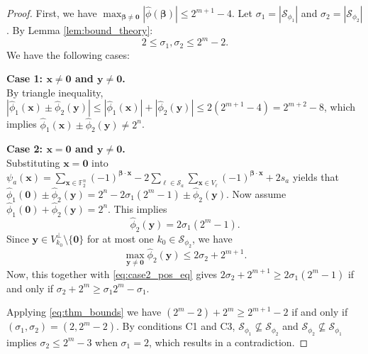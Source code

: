 \documentclass[pdflatex,sn-mathphys-num]{sn-jnl}%
\theoremstyle{thmstyleone}%
\theoremstyle{thmstyletwo}%
\theoremstyle{thmstylethree}%
\begin{document}
\begin{proof}
First, we have $\max_{\mathbf{\beta} \neq \mathbf{0}} |\widehat{\phi}(\mathbf{\beta})| \leq 2^{m+1} - 4$. Let $\sigma_1 = |\mathcal{S}_{\phi_1}|$ and $\sigma_2 = |\mathcal{S}_{\phi_2}|$. By Lemma \ref{lem:bound_theory}:
\begin{equation}\label{eq:thm_bounds}
2 \leq \sigma_1, \sigma_2 \leq 2^m - 2.
\end{equation}
We have the following cases:

\textbf{Case 1: $\mathbf{x} \neq \mathbf{0}$ and $\mathbf{y} \neq \mathbf{0}$.} \\
By triangle inequality, $|\widehat{\phi}_1(\mathbf{x}) \pm \widehat{\phi}_2(\mathbf{y})| \leq |\widehat{\phi}_1(\mathbf{x})| + |\widehat{\phi}_2(\mathbf{y})| \leq 2(2^{m+1}-4) = 2^{m+2}-8$, which  implies $\widehat{\phi}_1(\mathbf{x}) \pm \widehat{\phi}_2(\mathbf{y}) \neq 2^n$.


\textbf{Case 2: $\mathbf{x} = \mathbf{0}$ and $\mathbf{y} \neq \mathbf{0}$.} \\
Substituting $\mathbf{x} = \mathbf{0}$ into $\psi_a(\mathbf{x})=\sum_{\mathbf{x} \in \mathbb{F}_2^n} (-1)^{\mathbf{\beta} \cdot \mathbf{x}} - 2 \sum_{\ell \in \mathcal{S}_a} \sum_{\mathbf{x} \in V_\ell} (-1)^{\mathbf{\beta} \cdot \mathbf{x}} + 2s_a$  yields
that 
$\widehat{\phi}_1(\mathbf{0}) \pm \widehat{\phi}_2(\mathbf{y}) = 2^n - 2\sigma_1(2^m - 1) \pm \widehat{\phi}_2(\mathbf{y})$.
Now assume $\widehat{\phi}_1(\mathbf{0}) + \widehat{\phi}_2(\mathbf{y}) = 2^n$. This implies
\begin{equation}\label{eq:case2_pos_eq}
\widehat{\phi}_2(\mathbf{y}) = 2\sigma_1(2^m - 1).
\end{equation}
Since $\mathbf{y} \in V_{k_0}^\perp \setminus \{\mathbf{0}\}$ for at most one $k_0 \in \mathcal{S}_{\phi_2}$, we have 
\begin{equation}
\max_{\mathbf{y} \neq \mathbf{0}} \widehat{\phi}_2(\mathbf{y}) \leq 2\sigma_2 + 2^{m+1}. 
\end{equation}
Now, this together  with \eqref{eq:case2_pos_eq} gives 
$2\sigma_2 + 2^{m+1} \geq 2\sigma_1(2^m - 1)$ if and only if $\sigma_2 + 2^m \geq \sigma_1 2^m - \sigma_1$.

Applying \eqref{eq:thm_bounds} we have $(2^m - 2) + 2^m \geq 2^{m+1} - 2$ if and only if $(\sigma_1, \sigma_2) = (2, 2^m - 2)$.  By conditions C1 and C3, $\mathcal{S}_{\phi_1} \not\subseteq \mathcal{S}_{\phi_2}$ and $\mathcal{S}_{\phi_2} \not\subseteq \mathcal{S}_{\phi_1}$ implies $\sigma_2 \leq 2^m - 3$ when $\sigma_1 = 2$, which results in a contradiction.


\end{proof}
\end{document}
